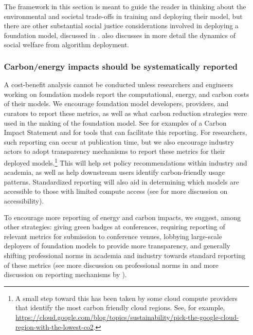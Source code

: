 The framework in this section is meant to guide the reader in thinking about the environmental and societal trade-offs in training and deploying their model, but there are other substantial social justice considerations involved in deploying a foundation model, discussed in .
 also discusses in more detail the dynamics of social welfare from algorithm deployment.

\subsubsection{Carbon/energy impacts should be systematically reported}
\label{sec:environment-reporting}

A cost-benefit analysis cannot be conducted unless researchers and engineers working on foundation models report the computational, energy, and carbon costs of their models.
We encourage foundation model developers, providers, and curators to report these metrics, as well as what carbon reduction strategies were used in the making of the foundation model. 
See \citep{henderson2020towards,lottick2019nergy,lacoste2019quantifying,codecarbon,anthony2020carbontracker} for examples of a Carbon Impact Statement and for tools that can facilitate this reporting.
For researchers, such reporting can occur at publication time, but we also encourage industry actors to adopt transparency mechanisms to report these metrics for their deployed models.\footnote{A small step toward this has been taken by some cloud compute providers that identify the most carbon friendly cloud regions. See, for example, \href{https://cloud.google.com/blog/topics/sustainability/pick-the-google-cloud-region-with-the-lowest-co2}{https://cloud.google.com/blog/topics/sustainability/pick-the-google-cloud-region-with-the-lowest-co2}.}
This will help set policy recommendations within industry and academia, as well as help downstream users identify carbon-friendly usage patterns.
Standardized reporting will also aid in determining which models are accessible to those with limited compute access (see  for more discussion on accessibility).

To encourage more reporting of energy and carbon impacts, we suggest, among other strategies: giving green badges at conferences, requiring reporting of relevant metrics for submission to conference venues, lobbying large-scale deployers of foundation models to provide more transparency, and generally shifting professional norms in academia and industry towards standard reporting of these metrics (see more discussion on professional norms in  and more discussion on reporting mechanisms by \citet{henderson2020towards}).